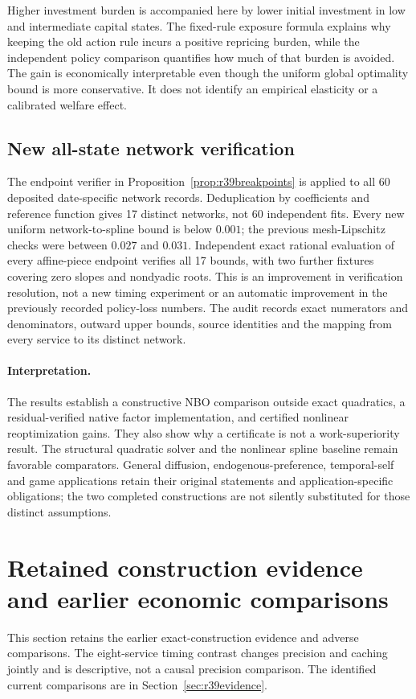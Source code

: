 \documentclass[ecta,nameyear,draft]{econsocart}
\theoremstyle{definition}
\theoremstyle{remark}
\begin{document}
Higher investment burden is accompanied here by lower initial investment in
low and intermediate capital states. The fixed-rule exposure formula explains
why keeping the old action rule incurs a positive repricing burden, while the
independent policy comparison quantifies how much of that burden is avoided.
The gain is economically interpretable even though the uniform global
optimality bound is more conservative. It does not identify an empirical
elasticity or a calibrated welfare effect.

\subsection{New all-state network verification}
The endpoint verifier in Proposition~\ref{prop:r39breakpoints} is applied to
all 60 deposited date-specific network records. Deduplication by coefficients
and reference function gives 17 distinct networks, not 60 independent fits.
Every new uniform network-to-spline bound is below $0.001$; the previous
mesh-Lipschitz checks were between $0.027$ and $0.031$. Independent exact
rational evaluation of every affine-piece endpoint verifies all 17 bounds,
with two further fixtures covering zero slopes and nondyadic roots.
This is an improvement in verification resolution, not a new timing experiment
or an automatic improvement in the previously recorded policy-loss numbers.
The audit records exact numerators and denominators, outward upper bounds,
source identities and the mapping from every service to its distinct network.

\paragraph{Interpretation.}
The results establish a constructive NBO comparison outside exact quadratics,
a residual-verified native factor implementation, and certified nonlinear
reoptimization gains. They also show why a certificate is not a work-superiority
result. The structural quadratic solver and the nonlinear spline baseline
remain favorable comparators. General diffusion, endogenous-preference,
temporal-self and game applications retain their original statements and
application-specific obligations; the two completed constructions are not
silently substituted for those distinct assumptions.

\section{Retained construction evidence and earlier economic comparisons}\label{sec:r37evidence}
This section retains the earlier exact-construction evidence and adverse comparisons. The eight-service timing contrast changes precision and caching jointly and is descriptive, not a causal precision comparison. The identified current comparisons are in Section~\ref{sec:r39evidence}.
\end{document}
